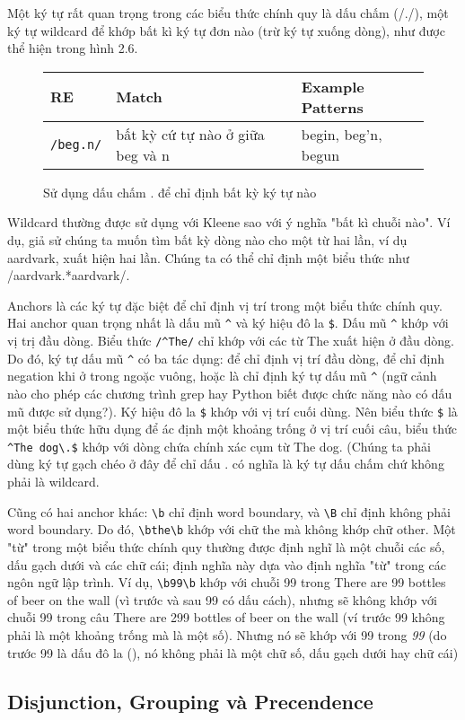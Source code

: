 Một ký tự rất quan trọng trong các biểu thức chính quy là dấu chấm (/./), một ký tự wildcard để khớp bất kì ký tự đơn nào (trừ ký tự xuống dòng), như được thể hiện trong hình 2.6.

\begin{figure}[h]
	\begin{tabular}{ l l l }
	 \hline
	 RE & Match & Example Patterns \\
	 \hline
	 \verb|/beg.n/| & bất kỳ cứ tự nào ở giữa beg và n & begin, beg'n, begun \\
	 \hline
	\end{tabular}
 \caption{Sử dụng dấu chấm . để chỉ định bất kỳ ký tự nào}
 \label{table:2.6}
\end{figure}

Wildcard thường được sử dụng với Kleene sao với ý nghĩa "bất kì chuỗi nào". Ví dụ, giả sử chúng ta muốn tìm bất kỳ dòng nào cho một từ hai lần, ví dụ aardvark, xuất hiện hai lần. Chúng ta có thể chỉ định một biểu thức như /aardvark.*aardvark/.

Anchors là các ký tự đặc biệt để chỉ định vị trí trong một biểu thức chính quy. Hai anchor quan trọng nhất là dấu mũ \verb|^| và ký hiệu đô la \verb|$|. Dấu mũ \verb|^| khớp với vị trị đầu dòng. Biểu thức \verb|/^The/| chỉ khớp với các từ The xuất hiện ở đầu dòng. Do đó, ký tự dấu mũ \verb|^| có ba tác dụng: để chỉ định vị trí đầu dòng, để chỉ định negation khi ở trong ngoặc vuông, hoặc là chỉ định ký tự dấu mũ \verb|^| (ngữ cảnh nào cho phép các chương trình grep hay Python biết được chức năng nào có dấu mũ được sử dụng?). Ký hiệu đô la \verb|$| khớp với vị trí cuối dùng. Nên biểu thức \textvisiblespace \verb|$| là một biểu thức hữu dụng để ác định một khoảng trống ở vị trí cuối câu, biểu thức \verb|^The dog\.$| khớp với dòng chứa chính xác cụm từ The dog. (Chúng ta phải dùng ký tự gạch chéo ở đây để chỉ dấu . có nghĩa là ký tự dấu chấm chứ không phải là wildcard.

Cũng có hai anchor khác: \verb|\b| chỉ định word boundary, và \verb|\B| chỉ định không phải word boundary. Do đó, \verb|\bthe\b| khớp với chữ the mà không khớp chữ other. Một "từ" trong một biểu thức chính quy thường được định nghĩ là một chuỗi các số, dấu gạch dưới và các chữ cái; định nghĩa này dựa vào định nghĩa "từ" trong các ngôn ngữ lập trình. Ví dụ, \verb|\b99\b| khớp với chuỗi 99 trong There are 99 bottles of beer on the wall (vì trước và sau 99 có dấu cách), nhưng sẽ không khớp với chuỗi 99 trong câu There are 299 bottles of beer on the wall (ví trước 99 không phải là một khoảng trống mà là một số). Nhưng nó sẽ khớp với 99 trong \textit{99} (do trước 99 là dấu đô la (), nó không phải là một chữ số, dấu gạch dưới hay chữ cái)

\subsection{Disjunction, Grouping và Precendence}
